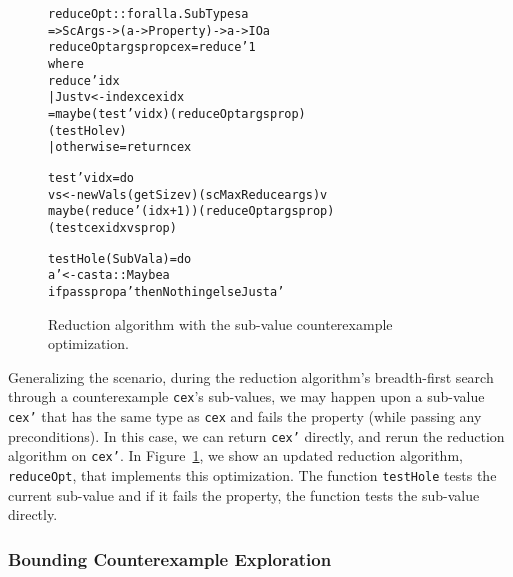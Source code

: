 \documentclass{sigplanconf}
\newenvironment{code}{\begin{alltt}}{\end{alltt}}
\newcommand{\ttp}[1]{\texttt{#1}}
\begin{document}

\begin{figure}
\begin{code}
reduceOpt :: forall a . SubTypes a
  => ScArgs -> (a -> Property) -> a -> IO a
reduceOpt args prop cex = reduce' 1
  where
  reduce' idx
    | Just v <- index cex idx
    = maybe (test' v idx) (reduceOpt args prop)
            (testHole v)
    | otherwise = return cex

  test' v idx = do
    vs <- newVals (getSize v) (scMaxReduce args) v
    maybe (reduce' (idx+1)) (reduceOpt args prop)
          (test cex idx vs prop)

  testHole (SubVal a) = do
    a' <- cast a :: Maybe a
    if pass prop a' then Nothing else Just a'
\end{code}
  \caption{Reduction algorithm with the sub-value counterexample optimization.}
  \label{fig:reduce0}
\end{figure}

Generalizing the scenario, during the reduction algorithm's breadth-first
search through a counterexample \ttp{cex}'s sub-values, we may happen upon a
sub-value \ttp{cex'} that has the same type as \ttp{cex} and fails the property
(while passing any preconditions).  In this case, we can return \ttp{cex'}
directly, and rerun the reduction algorithm on \ttp{cex'}.  In
Figure~\ref{fig:reduce0}, we show an updated reduction algorithm, \ttp{reduceOpt},
that implements this optimization.  The function \ttp{testHole} tests the
current sub-value and if it fails the property, the function tests the sub-value
directly.


\subsubsection{Bounding Counterexample Exploration}
\end{document}
